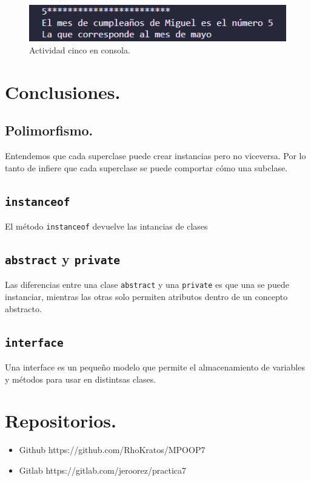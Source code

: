 \documentclass[conference]{IEEEtran}
\begin{document}
            \begin{figure}[htbp]
                \centerline{\includegraphics[scale=0.6]{./pics/12}}
                \caption{Actividad cinco en consola.}
                \label{fig13}
            \end{figure}
    \section{Conclusiones.}
        
        \subsection{Polimorfismo.}

            Entendemos que cada superclase puede crear instancias pero no viceversa.
            Por lo tanto de infiere que cada superclase se puede comportar cómo una subclase.

        \subsection{\texttt{instanceof}}

            El método \texttt{instanceof} devuelve las intancias de clases

        \subsection{\texttt{abstract} y \texttt{private}}

            Las diferencias entre una clase \texttt{abstract} y una \texttt{private} es que una se puede instanciar, mientras las otras solo permiten atributos dentro de un concepto abstracto.

        \subsection{\texttt{interface}}

            Una interface es un pequeño modelo que permite el almacenamiento de variables y métodos para usar en distintsas clases.

    \section{Repositorios.}

            \begin{itemize}
                \item Github https://github.com/RhoKratos/MPOOP7
                \item Gitlab https://gitlab.com/jeroorez/practica7
            \end{itemize}
    
    \medskip{}

    
    
    
\end{document}
